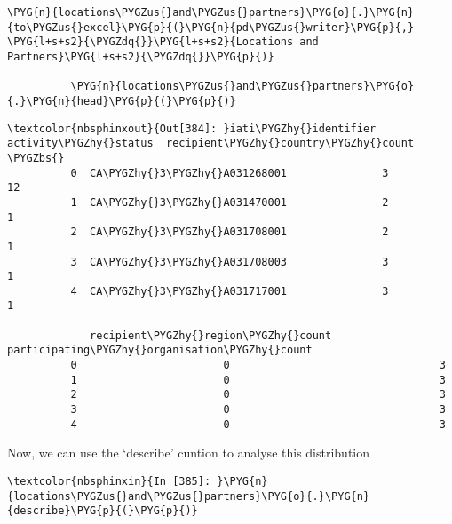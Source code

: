 \documentclass[letterpaper,10pt,english]{sphinxmanual}
\begin{document}
\begin{Verbatim}[commandchars=\\\{\}]
          \PYG{n}{locations\PYGZus{}and\PYGZus{}partners}\PYG{o}{.}\PYG{n}{to\PYGZus{}excel}\PYG{p}{(}\PYG{n}{pd\PYGZus{}writer}\PYG{p}{,} \PYG{l+s+s2}{\PYGZdq{}}\PYG{l+s+s2}{Locations and Partners}\PYG{l+s+s2}{\PYGZdq{}}\PYG{p}{)}
          
          \PYG{n}{locations\PYGZus{}and\PYGZus{}partners}\PYG{o}{.}\PYG{n}{head}\PYG{p}{(}\PYG{p}{)}
\end{Verbatim}

\begin{Verbatim}[commandchars=\\\{\}]
\textcolor{nbsphinxout}{Out[384]: }iati\PYGZhy{}identifier activity\PYGZhy{}status  recipient\PYGZhy{}country\PYGZhy{}count  \PYGZbs{}
          0  CA\PYGZhy{}3\PYGZhy{}A031268001               3                       12
          1  CA\PYGZhy{}3\PYGZhy{}A031470001               2                        1
          2  CA\PYGZhy{}3\PYGZhy{}A031708001               2                        1
          3  CA\PYGZhy{}3\PYGZhy{}A031708003               3                        1
          4  CA\PYGZhy{}3\PYGZhy{}A031717001               3                        1
          
             recipient\PYGZhy{}region\PYGZhy{}count  participating\PYGZhy{}organisation\PYGZhy{}count
          0                       0                                 3
          1                       0                                 3
          2                       0                                 3
          3                       0                                 3
          4                       0                                 3
\end{Verbatim}

Now, we can use the `describe' cuntion to analyse this distribution

\begin{Verbatim}[commandchars=\\\{\}]
\textcolor{nbsphinxin}{In [385]: }\PYG{n}{locations\PYGZus{}and\PYGZus{}partners}\PYG{o}{.}\PYG{n}{describe}\PYG{p}{(}\PYG{p}{)}
\end{Verbatim}
\end{document}
